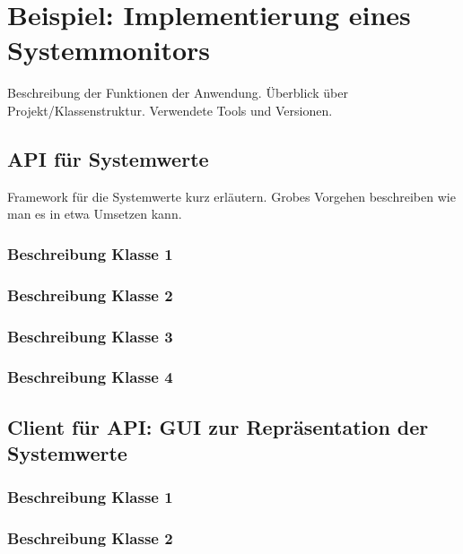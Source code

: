 \chapter{Beispiel: Implementierung eines Systemmonitors}\label{beispiel}
Beschreibung der Funktionen der Anwendung. Überblick über Projekt/Klassenstruktur. Verwendete Tools und Versionen. 
\section{API für Systemwerte}
Framework für die Systemwerte kurz erläutern. Grobes Vorgehen beschreiben wie man es in etwa Umsetzen kann.
\subsection{Beschreibung Klasse 1}
\subsection{Beschreibung Klasse 2}
\subsection{Beschreibung Klasse 3}
\subsection{Beschreibung Klasse 4}
\section{Client für API: GUI zur Repräsentation der Systemwerte}
\subsection{Beschreibung Klasse 1}
\subsection{Beschreibung Klasse 2}
